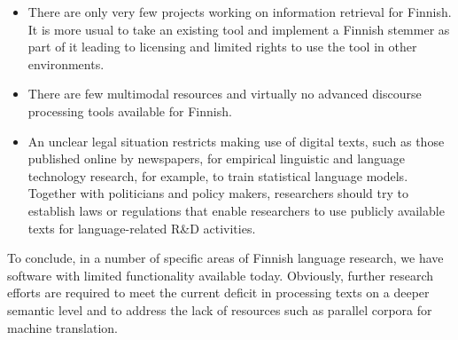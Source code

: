 \documentclass[]{../../metanetpaper}
\begin{document}
\begin{Parallel}[c]{77mm}{77mm}
{\begin{itemize}
\item There are only very few projects working on information retrieval for
    Finnish. It is more usual to take an existing tool and implement a Finnish
    stemmer as part of it leading to licensing and limited rights to use the
    tool in other environments.

\item There are few multimodal resources and virtually no advanced discourse
    processing tools available for Finnish.

\item An unclear legal situation restricts making use of digital texts, such as
    those published online by newspapers, for empirical linguistic and language
    technology research, for example, to train statistical language models.
    Together with politicians and policy makers, researchers should try to
    establish laws or regulations that enable researchers to use publicly
    available texts for language-related R\&D activities.
\end{itemize}

To conclude, in a number of specific areas of Finnish language research, we
have software with limited functionality available today. Obviously, further
research efforts are required to meet the current deficit in processing texts
on a deeper semantic level and to address the lack of resources such as
parallel corpora for machine translation.
}

\ParallelPar





\end{Parallel}
\end{document}
